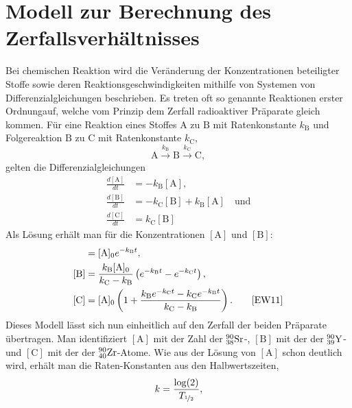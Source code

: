 \section{Modell zur Berechnung des Zerfallsverhältnisses}
Bei chemischen Reaktion wird die Veränderung der Konzentrationen beteiligter Stoffe sowie deren Reaktionsgeschwindigkeiten mithilfe von Systemen von Differenzialgleichungen beschrieben. Es treten oft so genannte Reaktionen \glqq erster Ordnung\grqq auf, welche vom Prinzip dem Zerfall radioaktiver Präparate gleich kommen. Für eine Reaktion eines Stoffes $\mathrm A$ zu $\mathrm B$ mit Ratenkonstante $k_\mathrm B$ und Folgereaktion $\mathrm B$ zu $\mathrm C$ mit Ratenkonstante $k_\mathrm C$,
\begin{equation}
\mathrm{A} \xrightarrow{k_{\mathrm{B}}} \mathrm{B} \xrightarrow{k_{\mathrm{C}}} \mathrm{C},
\end{equation}
gelten die Differenzialgleichungen
\begin{align}
\frac{d[\mathrm A]}{dt} &= -k_{\mathrm{B}} [\mathrm A],\\
\frac{d[\mathrm B]}{dt} &= -k_{\mathrm{C}} [\mathrm B] + k_{\mathrm{B}} [\mathrm A]\quad\text{und}\nonumber\\
\frac{d[\mathrm C]}{dt} &= k_{\mathrm{C}} [\mathrm B] \nonumber
\end{align}
Als Lösung erhält man für die Konzentrationen $[\mathrm A]$ und $[\mathrm B]$:
\begin{align}
[\mathrm A] &= [\mathrm A]_0 e^{-k_{\mathrm{B}} t},\\
[\mathrm B] &= \frac{k_{\mathrm{B}} [\mathrm A]_0}{k_{\mathrm{C}} - k_{\mathrm{B}}} \left(e^{-k_{\mathrm{B}} t} - e^{-k_{\mathrm{C}} t}\right),\nonumber\\
[\mathrm C] &= [\mathrm A]_0 \left( 1 + \frac{k_{\mathrm{B}} e^{-k_{\mathrm{C}} t} - k_{\mathrm{C}} e^{-k_{\mathrm{B}} t}}{k_{\mathrm{C}} - k_{\mathrm{B}}} \right).\qquad\cite{EW11}\nonumber
\end{align}
Dieses Modell lässt sich nun einheitlich auf den Zerfall der beiden Präparate übertragen. Man identifiziert $[\mathrm A]$ mit der Zahl der $\element{Sr}{38}{90}$-, $[\mathrm B]$ mit der der $\element{Y}{39}{90}$- und $[\mathrm C]$ mit der der $\element{Zr}{40}{90}$-Atome. Wie aus der Lösung von $[\mathrm A]$ schon deutlich wird, erhält man die Raten-Konstanten aus den Halbwertszeiten,
\begin{equation}
k = \frac{\log(2)}{T_{\nicefrac{1}{2}}}\label{eq:iii_3_umrechnung},
\end{equation}
